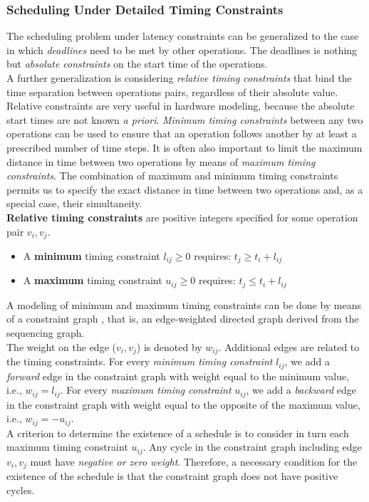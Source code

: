 \subsubsection{Scheduling Under Detailed Timing Constraints}
The scheduling problem under latency constraints can be generalized to the case in which  \textit{deadlines}  need to  be  met by other operations. The  deadlines is nothing but \textit{absolute constraints} on the  start  time of the operations.\\
A further generalization is considering  \textit{relative  timing constraints} that bind the time separation between operations pairs, regardless of their absolute value. Relative constraints are very useful in hardware modeling, because the absolute start times are not known \textit{a priori}. \textit{Minimum timing constraints} between any two operations can be used to ensure that an operation follows another by at least a prescribed number of time steps. It is often also important to limit the maximum distance in time between two operations by means of \textit{maximum timing constraints}. The combination of maximum and minimum timing constraints permits us to specify the exact distance in time between two operations and, as a special case, their simultaneity.\\
\textbf{Relative timing constraints} are positive integers specified for some operation pair $ v_i, v_j $.
\begin{itemize}
\item A  \textbf{minimum} timing constraint  $ l_{ij} \geq 0 $  requires:  $ t_j \geq t_i + l_{ij} $
\item A  \textbf{maximum} timing constraint  $ u_{ij} \geq 0 $  requires:  $ t_j \leq t_i + l_{ij} $
\end{itemize}
A  modeling of minimum and maximum timing constraints can be done by means of a constraint graph , that is, an edge-weighted directed graph derived from the sequencing graph.\\
The weight on the edge  ($ v_i, v_j $)  is denoted by  $ w_{ij} $.  Additional edges are related to the timing constraints. For every \textit{minimum timing constraint}  $ l_{ij} $,  we add a  \textit{forward}  edge  in the constraint graph with weight equal to the minimum value, i.e., $ w_{ij} = l_{ij} $.  For every \textit{maximum timing constraint}  $ u_{ij} $,  we add  a  \textit{backward}  edge in the constraint graph with weight equal to the opposite of the maximum value, i.e., $ w_{ij} = - u_{ij} $.\\
A criterion to determine the existence of a schedule is to consider in turn each maximum timing constraint  $ u_{ij} $. Any cycle in the constraint graph including edge $ v_i, v_j $ must have \textit{negative or zero weight}. Therefore, a necessary condition for the existence of the schedule is that the constraint graph does not have positive cycles.


